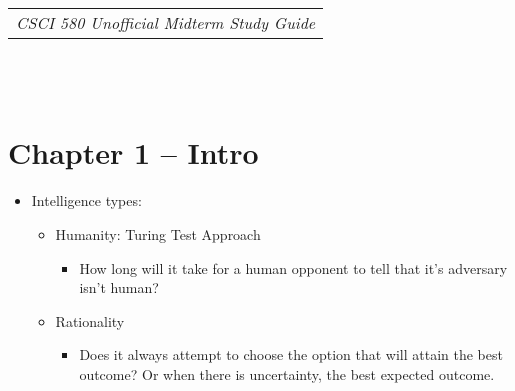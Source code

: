 \documentclass{article}
\begin{document}
	\null\hfill\begin{tabular}[t]{l@{}}
	\textit{CSCI 580 Unofficial Midterm Study Guide}\\
	\end{tabular} \\ \\
\section*{Chapter 1 -- Intro}
\begin{itemize}
	\item Intelligence types:
	\begin{itemize}
		\item Humanity: Turing Test Approach
		\begin{itemize}
			\item How long will it take for a human opponent to tell that it's adversary isn't human?
		\end{itemize}
		\item Rationality
		\begin{itemize}
			\item Does it always attempt to choose the option that will attain the best outcome? Or when there is uncertainty, the best expected outcome.
		\end{itemize}
	\end{itemize}
\end{itemize}
\end{document}
